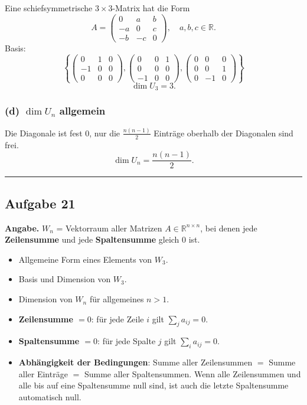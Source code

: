 \documentclass[a4paper,12pt]{article}
\begin{document}
Eine schiefsymmetrische $3\times 3$-Matrix hat die Form
\[
A = \begin{pmatrix} 0 & a & b \\ -a & 0 & c \\ -b & -c & 0 \end{pmatrix}, \quad a, b, c \in \mathbb{R}.
\]
Basis:
\[
\left\{
\begin{pmatrix} 0 & 1 & 0 \\ -1 & 0 & 0 \\ 0 & 0 & 0 \end{pmatrix},
\begin{pmatrix} 0 & 0 & 1 \\ 0 & 0 & 0 \\ -1 & 0 & 0 \end{pmatrix},
\begin{pmatrix} 0 & 0 & 0 \\ 0 & 0 & 1 \\ 0 & -1 & 0 \end{pmatrix}
\right\}
\]
\[\dim U_3 = 3.\]

\subsubsection*{(d) $\dim U_n$ allgemein}

Die Diagonale ist fest $0$, nur die $\tfrac{n(n-1)}{2}$ Eintr\"age oberhalb der Diagonalen sind frei.
\[
\dim U_n = \frac{n(n-1)}{2}.
\]

\bigskip
\hrule
\bigskip

\subsection*{Aufgabe 21}

\textbf{Angabe.} $W_n$ = Vektorraum aller Matrizen $A \in \mathbb{R}^{n\times n}$, bei denen jede \textbf{Zeilensumme} und jede \textbf{Spaltensumme} gleich $0$ ist.
\begin{itemize}[nosep]
\item[(a)] Allgemeine Form eines Elements von $W_3$.
\item[(b)] Basis und Dimension von $W_3$.
\item[(c)] Dimension von $W_n$ f\"ur allgemeines $n > 1$.
\end{itemize}

\begin{begriffe}
\begin{itemize}[leftmargin=*, nosep]
    \item \textbf{Zeilensumme $= 0$}: f\"ur jede Zeile $i$ gilt $\sum_j a_{ij} = 0$.
    \item \textbf{Spaltensumme $= 0$}: f\"ur jede Spalte $j$ gilt $\sum_i a_{ij} = 0$.
    \item \textbf{Abh\"angigkeit der Bedingungen}: Summe aller Zeilensummen $=$ Summe aller Eintr\"age $=$ Summe aller Spaltensummen. Wenn alle Zeilensummen und alle bis auf eine Spaltensumme null sind, ist auch die letzte Spaltensumme automatisch null.
\end{itemize}
\end{begriffe}
\end{document}
